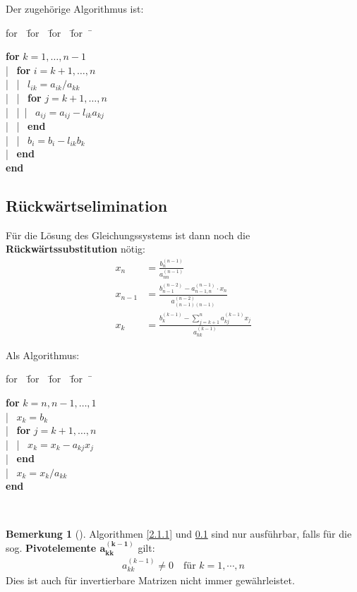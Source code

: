 \documentclass[ngerman,fontsize=11pt, paper=a4, parskip=half, titlepage=true, toc=bib]{scrbook}
\theoremstyle{definition}
\newtheorem{Bem}[Def]{Bemerkung}	%
\theoremstyle{plain}
\newcommand{\subsectione}[1]{\addtocounter{Def}{1}\subsection{#1}}
\newenvironment{Beme}[1][]{ %
	\begin{Bem}[#1]
	}
	{
	\end{Bem}
	\addtocounter{subsection}{1}
}
\newenvironment{pseudocode}[1]{ %
  \begin{minipage}{#1}
    \begin{framed}
      \hspace*{1em}	
      \begin{minipage}{#1}
        \begin{tabbing}
          for~~\= for~~\= for~~\= for~~\= \kill
	}
	{ %
        \end{tabbing}
      \end{minipage}
      \hspace*{1em}
    \end{framed}
  \end{minipage}
}
\begin{document}
Der zugehörige Algorithmus ist:

\begin{pseudocode}{0.5\linewidth}
  \textbf{for} $ k = 1, \dots , n-1$\\
  |~	\> \textbf{for} $i = k + 1, \dots , n$ \\
  |~	\> |~\> $l_{ik} = a_{ik} /a_{kk}$\\
  |~	\> |~\> \textbf{for} $j = k + 1, \dots , n$ \\
  |~	\> |~\>|~\> $a_{ij} = a_{ij} - l_{ik} a_{kj} $\\
  |~	\> |~\> \textbf{end}\\
  |~	\> |~\> $b_i = b_i -  l_{ik} b_k $\\
  |~	\> \textbf{end} \\
  \textbf{end}
\end{pseudocode}

\subsectione{Rückwärtselimination}\label{2.1.2}
Für die Lösung des Gleichungssystems ist dann noch die
 \textbf{Rückwärtssubstitution}  nötig:
\begin{align}
  x_n &= \frac{b_n^{(n-1)}}{a_{nn}^{(n-1)}} \label{II.1.5} \\
  x_{n-1} &=  \frac{b_{n-1}^{(n-2)}-a_{n-1,n}^{(n-1)}\cdot x_n}
  							 {a_{(n-1)(n-1)}^{(n-2)}} \label{II.1.6} \\
  x_k &= \frac{b_k^{(k-1)}-\sum_{j=k+1}^{n}a_{kj}^{(k-1)}x_j}
                     {a_{kk}^{(k-1)}} \label{II.1.7}
\end{align}

Als Algorithmus:

\begin{pseudocode}{0.5\linewidth}
  \textbf{for} $k = n, n -1, \dots , 1$ \\
  |~		\>$x_k = b_k$ \\
  |~		\>\textbf{for} $j = k + 1, \dots , n$ \\
  |~		\>|~	$x_k = x_k - a_{kj}x_j$ \\
  |~		\>\textbf{end} \\
  |~		\>$x_k = x_k /a_{kk}$ \\
  \textbf{end}
\end{pseudocode}~\\

\begin{Beme}
	Algorithmen \ref{2.1.1} und \ref{2.1.2} sind nur ausführbar,
	falls für die sog. \textbf{Pivotelemente $\mathbf{a_{kk}^{(k-1)}}$ }  gilt:
	\begin{gather*}
	a_{kk}^{(k-1)} \neq 0 \quad   \text{für } k=1, \cdots , n
	\end{gather*}
	Dies ist auch für invertierbare Matrizen nicht immer gewährleistet.
\end{Beme}
\end{document}
